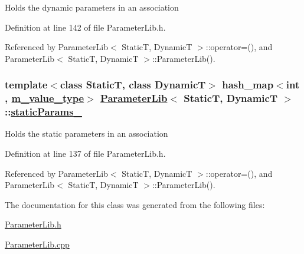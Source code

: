 Holds the dynamic parameters in an association 

Definition at line 142 of file Parameter\-Lib.h.

Referenced by Parameter\-Lib$<$ Static\-T, Dynamic\-T $>$::operator=(), and Parameter\-Lib$<$ Static\-T, Dynamic\-T $>$::Parameter\-Lib().\hypertarget{classParameterLib_r0}{
\subsubsection[staticParams\_\-]{\setlength{\rightskip}{0pt plus 5cm}template$<$class Static\-T, class Dynamic\-T$>$ hash\_\-map$<$int , \hyperlink{Types_8h_a3}{m\_\-value\_\-type}$>$ \hyperlink{classParameterLib}{Parameter\-Lib}$<$ Static\-T, Dynamic\-T $>$::\hyperlink{classParameterLib_r0}{static\-Params\_\-}}}
\label{classParameterLib_r0}


Holds the static parameters in an association 

Definition at line 137 of file Parameter\-Lib.h.

Referenced by Parameter\-Lib$<$ Static\-T, Dynamic\-T $>$::operator=(), and Parameter\-Lib$<$ Static\-T, Dynamic\-T $>$::Parameter\-Lib().

The documentation for this class was generated from the following files:\begin{CompactItemize}
\item 
\hyperlink{ParameterLib_8h}{Parameter\-Lib.h}\item 
\hyperlink{ParameterLib_8cpp}{Parameter\-Lib.cpp}\end{CompactItemize}
